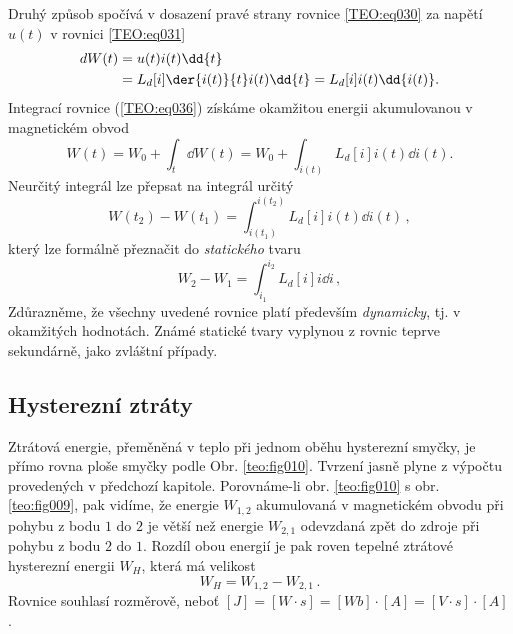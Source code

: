       Druhý způsob spočívá v dosazení pravé strany rovnice \ref{TEO:eq030} za napětí \(u(t)\) v 
      rovnici \ref{TEO:eq031}
      \begin{align}\label{TEO:eq036}
        dW(t) &= u(t)i(t)\dd{t}                            \nonumber \\
              &= L_d[i]\der{i(t)}{t}i(t)\dd{t} = L_d[i]i(t)\dd{i(t)}.
      \end{align}
      Integrací rovnice (\ref{TEO:eq036}) získáme okamžitou energii akumulovanou v magnetickém obvod
      \begin{equation}\label{TEO:eq037}
        W(t) = W_0 + \int_t\dd{W(t)} = W_0 + \int_{i(t)} L_d[i]i(t)\dd{i(t)}.
      \end{equation}
      Neurčitý integrál lze přepsat na integrál určitý
      \begin{equation}\label{TEO:eq038}
        \boxed{W(t_2) - W(t_1)  = \int_{i(t_1)}^{i(t_2)} L_d[i]i(t)\dd{i(t)}}\,,
      \end{equation}
      který lze formálně přeznačit do \emph{statického} tvaru
      \begin{equation}\label{TEO:eq039}
        \boxed{W_2 - W_1 = \int_{i_1}^{i_2} L_d[i]i\dd{i}}\,,
      \end{equation}
      Zdůrazněme, že všechny uvedené rovnice platí především \emph{dynamicky}, tj. v okamžitých 
      hodnotách. Známé statické tvary vyplynou z rovnic teprve sekundárně, jako zvláštní případy. 
      
    \subsection{Hysterezní ztráty}
      Ztrátová energie, přeměněná v teplo při jednom oběhu hysterezní smyčky, je přímo rovna ploše 
      smyčky podle Obr. \ref{teo:fig010}. Tvrzení jasně plyne z výpočtu provedených v předchozí 
      kapitole. Porovnáme-li obr. \ref{teo:fig010} s obr. \ref{teo:fig009}, pak vidíme, že energie 
      \(W_{1,2}\) akumulovaná v magnetickém obvodu při pohybu z bodu \(1\) do \(2\) je větší než 
      energie \(W_{2,1}\) odevzdaná zpět do zdroje při pohybu z bodu \(2\) do \(1\). Rozdíl obou 
      energií je pak roven tepelné ztrátové hysterezní energii \(W_H\), která má velikost
      \begin{equation}\label{TEO:eq040}
        W_H = W_{1,2} - W_{2,1}\,.
      \end{equation}
      Rovnice souhlasí rozměrově, neboť \([J] = [W\cdot s] = [Wb]\cdot[A] = [V\cdot s]\cdot[A]\).
      
